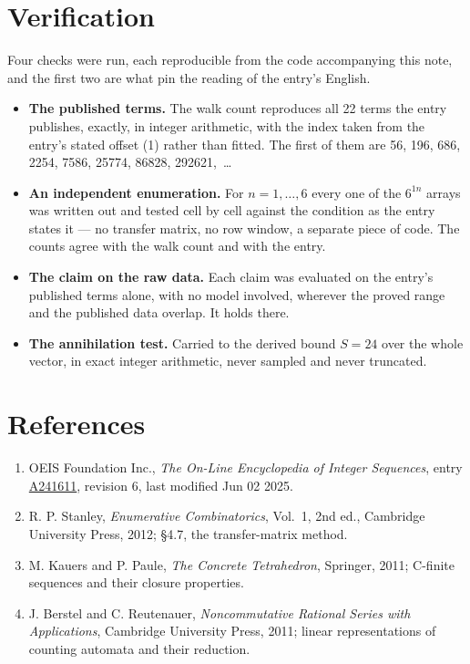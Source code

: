 \documentclass[11pt]{article}
\theoremstyle{definition}
\begin{document}
\section{Verification}

Four checks were run, each reproducible from the code accompanying this note, and the first two are what pin the reading of the entry's English.

\begin{itemize}

\item {\bfseries The published terms.} The walk count reproduces all 22 terms the entry publishes, exactly, in integer arithmetic, with the index taken from the entry's stated offset (1) rather than fitted. The first of them are 56, 196, 686, 2254, 7586, 25774, 86828, 292621,~\dots

\item {\bfseries An independent enumeration.} For $n = 1,\dots,6$ every one of the $6^{1n}$ arrays was written out and tested cell by cell against the condition as the entry states it --- no transfer matrix, no row window, a separate piece of code. The counts agree with the walk count and with the entry.

\item {\bfseries The claim on the raw data.} Each claim was evaluated on the entry's published terms alone, with no model involved, wherever the proved range and the published data overlap. It holds there.

\item {\bfseries The annihilation test.} Carried to the derived bound $S = 24$ over the whole vector, in exact integer arithmetic, never sampled and never truncated.

\end{itemize}

\section{References}

\begin{enumerate}

\item OEIS Foundation Inc., \emph{The On-Line Encyclopedia of Integer Sequences}, entry \href{https://oeis.org/A241611}{A241611}, revision 6, last modified Jun 02 2025.

\item R. P. Stanley, \emph{Enumerative Combinatorics}, Vol.~1, 2nd ed., Cambridge University Press, 2012; \S4.7, the transfer-matrix method.

\item M. Kauers and P. Paule, \emph{The Concrete Tetrahedron}, Springer, 2011; C-finite sequences and their closure properties.

\item J. Berstel and C. Reutenauer, \emph{Noncommutative Rational Series with Applications}, Cambridge University Press, 2011; linear representations of counting automata and their reduction.

\end{enumerate}
\end{document}
